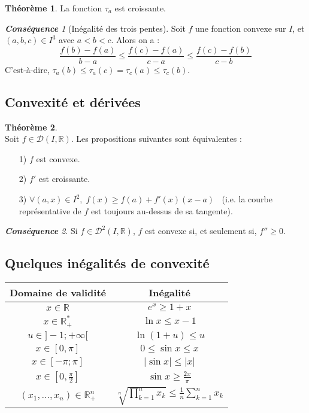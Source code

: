 \documentclass[12pt]{book}
\let\ensembleNombre\mathbb
\newcommand*\R{\ensuremath{\ensembleNombre{R}}}
\theoremstyle{definition}
\newtheorem{thme}{Théorème}[chapter]
\theoremstyle{remark}
\newtheorem*{cons}{\textbf{Conséquence}}
\newenvironment{fthme}
  {\begin{mdframed}[roundcorner=10pt, linewidth=2pt]\begin{thme}}
  {\end{thme}\end{mdframed}}
\begin{document}
	\begin{fthme}
	La fonction $\tau_a$ est croissante.
	\end{fthme}
	
	\begin{cons}[Inégalité des trois pentes]
	Soit $f$ une fonction convexe sur $I$, et $(a,b,c) \in I^3$ avec $a < b < c$. Alors on a :
	\[ \frac{f(b) - f(a)}{b - a} \leq \frac{f(c) - f(a)}{c-a} \leq \frac{f(c) - f(b)}{c - b} \]
	C'est-à-dire, $\boxed{\tau_a(b) \leq \tau_a(c) = \tau_c(a) \leq \tau_c(b).}$
	\end{cons}
	
	\subsection{Convexité et dérivées}
	\begin{fthme}\mbox{~}\\
	Soit $f \in \mathcal D(I, \R)$. Les propositions suivantes sont équivalentes :
	\begin{itemize}
	\item[1)] $f$ est convexe.
	\item[2)] $f'$ est croissante.
	\item[3)] $\forall (a,x) \in I^2,\; f(x) \geq f(a) + f'(x)(x-a)\;\;$ (i.e. la courbe représentative de $f$ est toujours au-dessus de sa tangente).
	\end{itemize}
	\end{fthme}
	
	\begin{cons}
	Si $f \in \mathcal D^2(I, \R)$, $f$ est convexe si, et seulement si, $f'' \geq 0$.
	\end{cons}
	
	\subsection{Quelques inégalités de convexité}
	\begin{center}
	\begin{tabular}{|c|c|}
	\hline
	Domaine de validité & Inégalité \\
	\hline
	$x \in \R$ & $e^x \geq 1+x$ \\
	\hline
	$x \in \R_+^*$ & $\ln x \leq x - 1$ \\
	\hline
	$u \in ] -1; +\infty[$ & $\ln (1+u) \leq u$\\
	\hline
	$x \in[0,\pi]$ & $0 \leq \sin x \leq x$ \\
	\hline
	$x \in[-\pi; \pi]$ & $|\sin x | \leq |x|$ \\
	\hline
	$x \in\left[0, \frac{\pi}{2} \right]$ & $\sin x \geq \frac{2x}{\pi}$\\
	\hline
	$(x_1, \ldots, x_n) \in \R_+^n$ & $\sqrt[n\,]{\prod_{k=1}^n x_k} \leq \frac{1}{n} \sum_{k=1}^n x_k$\\
	\hline
	\end{tabular}
	\end{center}
	
\end{document}
